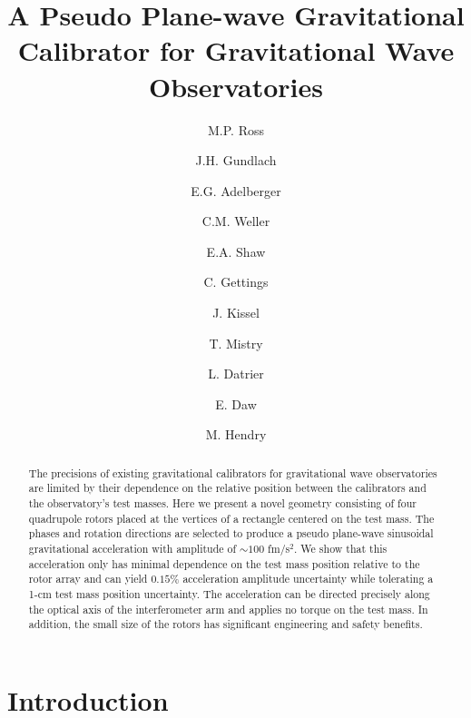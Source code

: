 \documentclass[superscriptaddress, twocolumn, prd]{revtex4-1}
\begin{document}
\title{A Pseudo Plane-wave Gravitational Calibrator for Gravitational Wave Observatories}

\author{M.P. Ross}
\author{J.H. Gundlach}
\author{E.G. Adelberger}
\author{C.M. Weller}
\author{E.A. Shaw}
\author{C. Gettings}
\author{J. Kissel}
\author{T. Mistry}
\author{L. Datrier}
\author{E. Daw}
\author{M. Hendry}



\begin{abstract}

 The precisions of existing gravitational calibrators for gravitational wave observatories are limited by their dependence on the relative position between the calibrators and the observatory's test masses. Here we present a novel geometry consisting of four quadrupole rotors placed at the vertices of a rectangle centered on the test mass. The phases and rotation directions are selected to produce a pseudo plane-wave  sinusoidal gravitational acceleration with amplitude of $\sim100$ fm/s$^2$. We show that this acceleration only has minimal dependence on the test mass position relative to the rotor array and can yield $0.15 \%$ acceleration amplitude uncertainty while tolerating a 1-cm test mass position uncertainty. The acceleration can be directed precisely along the optical axis of the interferometer arm and applies no torque on the test mass. In addition, the small size of the rotors has significant engineering and safety benefits.

\end{abstract}

\maketitle

\section{Introduction}
\end{document}
